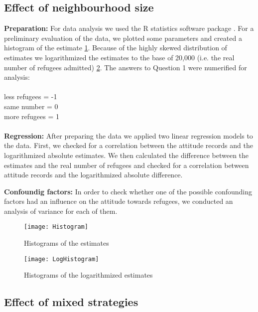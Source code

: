 \subsection{Effect of neighbourhood size}

\textbf{Preparation:} For data analysis we used the R statistics software package \citep{RCoreTeam2014}. For a preliminary evaluation of the data, we plotted some parameters and created a histogram of the estimate \ref{fig: Histogram1}. Because of the highly skewed distribution of estimates we logarithmized the estimates to the base of 20,000 (i.e. the real number of refugees admitted) \ref{fig: Histogram2}.
The answers to Question 1 were numerified for analysis: \\
\\
\indent\indent less refugees = -1\\
\indent\indent same number = 0\\
\indent\indent more refugees = 1\\
\\
\textbf{Regression:} After preparing the data we applied two linear regression models to the data. First, we checked for a correlation between the attitude records and the logarithmized absolute estimates. We then calculated the difference between the estimates and the real number of refugees and checked for a correlation between attitude records and the logarithmized absolute difference.


\noindent\textbf{Confoundig factors:} In order to check whether one of the possible confounding factors had an influence on the attitude towards refugees, we conducted an analysis of variance for each of them.



\begin{figure}[H]
	\centering 
	\texttt{[image: Histogram]}
	\caption{Histograms of the estimates}\label{fig: Histogram1}
\end{figure}

\begin{figure}[H]
	\centering 
	\texttt{[image: LogHistogram]}
	\caption{Histograms of the logarithmized estimates}\label{fig: Histogram2}
\end{figure}




\subsection{Effect of mixed strategies}